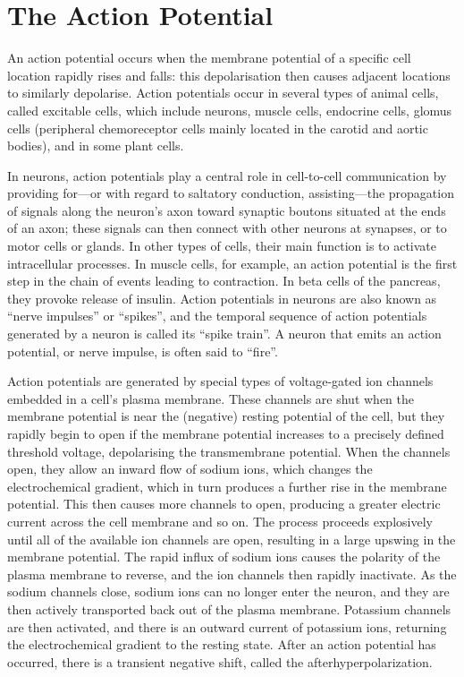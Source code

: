 \hypertarget{the-action-potential}{%
\section{The Action Potential}\label{the-action-potential}}

An action potential occurs when the membrane potential of a specific cell location rapidly rises and falls: this depolarisation then causes adjacent locations to similarly depolarise. Action potentials occur in several types of animal cells, called excitable cells, which include neurons, muscle cells, endocrine cells, glomus cells (peripheral chemoreceptor cells mainly located in the carotid and aortic bodies), and in some plant cells.

In neurons, action potentials play a central role in cell-to-cell communication by providing for---or with regard to saltatory conduction, assisting---the propagation of signals along the neuron's axon toward synaptic boutons situated at the ends of an axon; these signals can then connect with other neurons at synapses, or to motor cells or glands. In other types of cells, their main function is to activate intracellular processes. In muscle cells, for example, an action potential is the first step in the chain of events leading to contraction. In beta cells of the pancreas, they provoke release of insulin. Action potentials in neurons are also known as ``nerve impulses'' or ``spikes'', and the temporal sequence of action potentials generated by a neuron is called its ``spike train''. A neuron that emits an action potential, or nerve impulse, is often said to ``fire''.

Action potentials are generated by special types of voltage-gated ion channels embedded in a cell's plasma membrane. These channels are shut when the membrane potential is near the (negative) resting potential of the cell, but they rapidly begin to open if the membrane potential increases to a precisely defined threshold voltage, depolarising the transmembrane potential. When the channels open, they allow an inward flow of sodium ions, which changes the electrochemical gradient, which in turn produces a further rise in the membrane potential. This then causes more channels to open, producing a greater electric current across the cell membrane and so on. The process proceeds explosively until all of the available ion channels are open, resulting in a large upswing in the membrane potential. The rapid influx of sodium ions causes the polarity of the plasma membrane to reverse, and the ion channels then rapidly inactivate. As the sodium channels close, sodium ions can no longer enter the neuron, and they are then actively transported back out of the plasma membrane. Potassium channels are then activated, and there is an outward current of potassium ions, returning the electrochemical gradient to the resting state. After an action potential has occurred, there is a transient negative shift, called the afterhyperpolarization.

